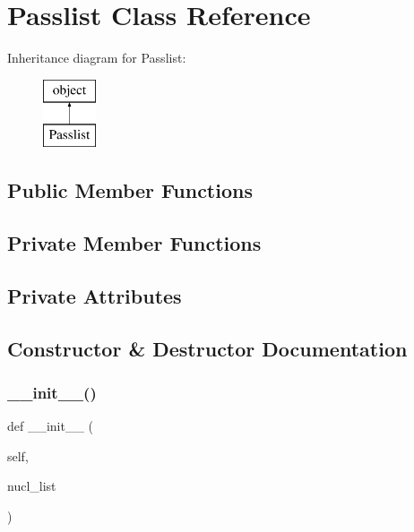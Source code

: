 \hypertarget{classopenbu_1_1passlist_1_1_passlist}{}\section{Passlist Class Reference}
\label{classopenbu_1_1passlist_1_1_passlist}
Inheritance diagram for Passlist\+:\begin{figure}[H]
\begin{center}
\leavevmode
\includegraphics[height=2.000000cm]{classopenbu_1_1passlist_1_1_passlist}
\end{center}
\end{figure}
\subsection*{Public Member Functions}
\subsection*{Private Member Functions}
\subsection*{Private Attributes}


\subsection{Constructor \& Destructor Documentation}
\mbox{\label{classopenbu_1_1passlist_1_1_passlist_a18ceec79045f956c932080bfe8a438db}} 
\subsubsection{\texorpdfstring{\+\_\+\+\_\+init\+\_\+\+\_\+()}{\_\_init\_\_()}}
{\footnotesize\ttfamily def \+\_\+\+\_\+init\+\_\+\+\_\+ (\begin{DoxyParamCaption}\item[{}]{self,  }\item[{}]{nucl\+\_\+list }\end{DoxyParamCaption})}



